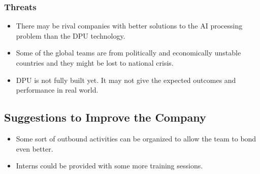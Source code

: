 \subsubsection*{Threats}
\begin{itemize}
    \item There may be rival companies with better solutions to the AI processing problem than the DPU technology.
    \item Some of the global teams are from politically and economically unstable countries and they might be lost to national crisis.
    \item DPU is not fully built yet. It may not give the expected outcomes and performance in real world.
\end{itemize}

\subsection{Suggestions to Improve the Company}
\begin{itemize}
    \item Some sort of outbound activities can be organized to allow the team to bond even better.
    \item Interns could be provided with some more training sessions.
\end{itemize}